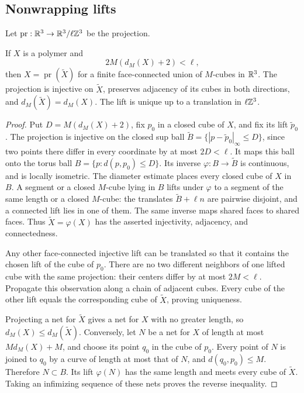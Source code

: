 \subsection{Nonwrapping lifts}\label{subsec:polymer-lifts}

Let $\operatorname{pr}:\mathbb R^3\to\mathbb R^3/\ell\mathbb Z^3$ be the projection.
\begin{proposition}\label{prop:nonwrapping-polymer-lift}
If $X$ is a polymer and
\begin{equation}\label{eq:nonwrapping-polymer-condition}
 2M(d_M(X)+2)<\ell,
\end{equation}
then $X=\operatorname{pr}(\widetilde X)$ for a finite face-connected
union of $M$-cubes in $\mathbb R^3$. The projection is injective on
$\widetilde X$, preserves adjacency of its cubes in both directions,
and $d_M(\widetilde X)=d_M(X)$. The lift is unique up to a translation
in $\ell\mathbb Z^3$.
\end{proposition}

\begin{proof}
Put $D=M(d_M(X)+2)$, fix $p_0$ in a closed cube of $X$, and fix its
lift $\widetilde p_0$. The projection is injective on the closed sup
ball $\widetilde B=\{|p-\widetilde p_0|_\infty\le D\}$, since two
points there differ in every coordinate by at most $2D<\ell$.
It maps this ball onto the torus ball $B=\{p:d(p,p_0)\le D\}$.
Its inverse $\varphi:B\to\widetilde B$ is continuous, and is locally
isometric. The diameter estimate places every closed cube of $X$ in
$B$. A segment or a closed $M$-cube lying in $B$ lifts under
$\varphi$ to a segment of the same length or a closed $M$-cube:
the translates $\widetilde B+\ell n$ are pairwise disjoint, and a
connected lift lies in one of them. The same inverse maps shared
faces to shared faces. Thus $\widetilde X=\varphi(X)$ has the
asserted injectivity, adjacency, and connectedness.

Any other face-connected injective lift can be translated so that it
contains the chosen lift of the cube of $p_0$. There are no two
different neighbors of one lifted cube with the same projection:
their centers differ by at most $2M<\ell$. Propagate this observation
along a chain of adjacent cubes. Every cube of the other lift equals
the corresponding cube of $\widetilde X$, proving uniqueness.

Projecting a net for $\widetilde X$ gives a net for $X$ with no greater
length, so $d_M(X)\le d_M(\widetilde X)$. Conversely, let $N$ be a
net for $X$ of length at most $Md_M(X)+M$, and choose its point $q_0$
in the cube of $p_0$. Every point of $N$ is joined to $q_0$ by a
curve of length at most that of $N$, and $d(q_0,p_0)\le M$.
Therefore $N\subset B$. Its lift $\varphi(N)$ has the same length
and meets every cube of $\widetilde X$. Taking an infimizing sequence
of these nets proves the reverse inequality.
\end{proof}

\printbibliography

